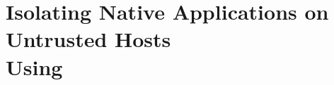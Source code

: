 \declarecommand{\sysname}{\gsgx{}}


\chapter{Isolating Native Applications on Untrusted Hosts\\ Using \sysname{}}
\label{chap:gsgx}








